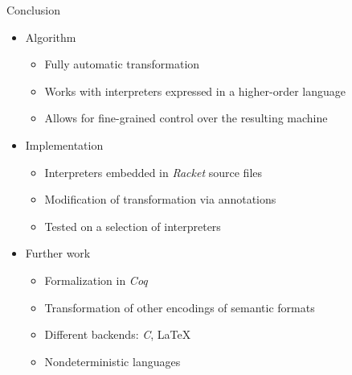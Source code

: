 \documentclass{beamer}
\begin{document}
\begin{frame}{Conclusion}
  \begin{itemize}
    \item Algorithm
    \begin{itemize}
      \item Fully automatic transformation
      \item Works with interpreters expressed in a higher-order language
      \item Allows for fine-grained control over the resulting machine
    \end{itemize}
    \item Implementation
    \begin{itemize}
      \item Interpreters embedded in \textit{Racket} source files
      \item Modification of transformation via annotations
      \item Tested on a selection of interpreters
    \end{itemize}
    \item Further work
    \begin{itemize}
      \item Formalization in \textit{Coq}
      \item Transformation of other encodings of semantic formats
      \item Different backends: \textit{C}, \LaTeX
      \item Nondeterministic languages
    \end{itemize}
  \end{itemize}  
\end{frame}
\end{document}
